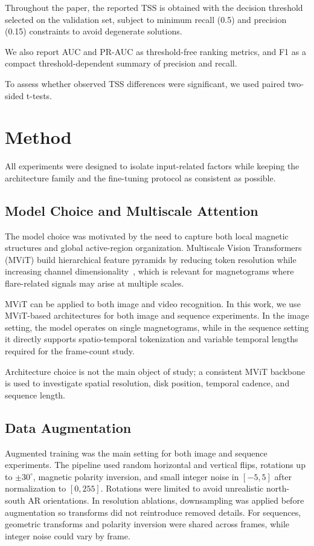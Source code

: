 \documentclass[runningheads]{llncs}
\begin{document}
Throughout the paper, the reported TSS is obtained with the decision threshold selected on the validation set, subject to minimum recall (0.5) and precision (0.15) constraints to avoid degenerate solutions. 

We also report AUC and PR-AUC as threshold-free ranking metrics, and F1 as a compact threshold-dependent summary of precision and recall.

To assess whether observed TSS differences were significant, we used paired two-sided t-tests.

\section{Method}

All experiments were designed to isolate input-related factors while keeping the architecture family and the fine-tuning protocol as consistent as possible.

\subsection{Model Choice and Multiscale Attention}

The model choice was motivated by the need to capture both local magnetic structures and global active-region organization. Multiscale Vision Transformers (MViT) build hierarchical feature pyramids by reducing token resolution while increasing channel dimensionality~\cite{ref_mvit}, which is relevant for magnetograms where flare-related signals may arise at multiple scales.

MViT can be applied to both image and video recognition. In this work, we use MViT-based architectures for both image and sequence experiments. In the image setting, the model operates on single magnetograms, while in the sequence setting it directly supports spatio-temporal tokenization and variable temporal lengths required for the frame-count study.

Architecture choice is not the main object of study; a consistent MViT backbone is used to investigate spatial resolution, disk position, temporal cadence, and sequence length.


\subsection{Data Augmentation}

Augmented training was the main setting for both image and sequence experiments. The pipeline used random horizontal and vertical flips, rotations up to $\pm 30^\circ$, magnetic polarity inversion, and small integer noise in $[-5,5]$ after normalization to $[0,255]$. Rotations were limited to avoid unrealistic north-south AR orientations. In resolution ablations, downsampling was applied before augmentation so transforms did not reintroduce removed details. For sequences, geometric transforms and polarity inversion were shared across frames, while integer noise could vary by frame.
\end{document}
